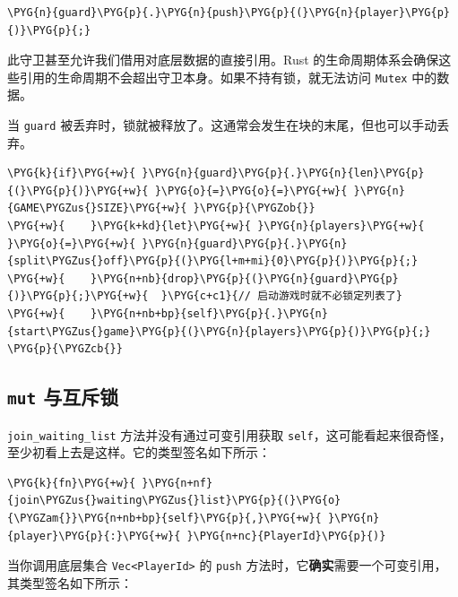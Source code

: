 \begin{Verbatim}[commandchars=\\\{\},breaklines=true,breakanywhere=true,fontsize=\codefont,xleftmargin=17bp]
\PYG{n}{guard}\PYG{p}{.}\PYG{n}{push}\PYG{p}{(}\PYG{n}{player}\PYG{p}{)}\PYG{p}{;}
\end{Verbatim}

此守卫甚至允许我们借用对底层数据的直接引用。Rust 的生命周期体系会确保这些引用的生命周期不会超出守卫本身。如果不持有锁，就无法访问 \texttt{Mutex} 中的数据。

当 \texttt{guard} 被丢弃时，锁就被释放了。这通常会发生在块的末尾，但也可以手动丢弃。

\begin{Verbatim}[commandchars=\\\{\},breaklines=true,breakanywhere=true,fontsize=\codefont,xleftmargin=17bp]
\PYG{k}{if}\PYG{+w}{ }\PYG{n}{guard}\PYG{p}{.}\PYG{n}{len}\PYG{p}{(}\PYG{p}{)}\PYG{+w}{ }\PYG{o}{=}\PYG{o}{=}\PYG{+w}{ }\PYG{n}{GAME\PYGZus{}SIZE}\PYG{+w}{ }\PYG{p}{\PYGZob{}}
\PYG{+w}{    }\PYG{k+kd}{let}\PYG{+w}{ }\PYG{n}{players}\PYG{+w}{ }\PYG{o}{=}\PYG{+w}{ }\PYG{n}{guard}\PYG{p}{.}\PYG{n}{split\PYGZus{}off}\PYG{p}{(}\PYG{l+m+mi}{0}\PYG{p}{)}\PYG{p}{;}
\PYG{+w}{    }\PYG{n+nb}{drop}\PYG{p}{(}\PYG{n}{guard}\PYG{p}{)}\PYG{p}{;}\PYG{+w}{  }\PYG{c+c1}{// 启动游戏时就不必锁定列表了}
\PYG{+w}{    }\PYG{n+nb+bp}{self}\PYG{p}{.}\PYG{n}{start\PYGZus{}game}\PYG{p}{(}\PYG{n}{players}\PYG{p}{)}\PYG{p}{;}
\PYG{p}{\PYGZcb{}}
\end{Verbatim}

\subsection{\texttt{mut} 与互斥锁}

\texttt{join\_waiting\_list} 方法并没有通过可变引用获取 \texttt{self}，这可能看起来很奇怪，至少初看上去是这样。它的类型签名如下所示：

\begin{Verbatim}[commandchars=\\\{\},breaklines=true,breakanywhere=true,fontsize=\codefont,xleftmargin=17bp]
\PYG{k}{fn}\PYG{+w}{ }\PYG{n+nf}{join\PYGZus{}waiting\PYGZus{}list}\PYG{p}{(}\PYG{o}{\PYGZam{}}\PYG{n+nb+bp}{self}\PYG{p}{,}\PYG{+w}{ }\PYG{n}{player}\PYG{p}{:}\PYG{+w}{ }\PYG{n+nc}{PlayerId}\PYG{p}{)}
\end{Verbatim}

当你调用底层集合 \texttt{Vec<PlayerId>} 的 \texttt{push} 方法时，它\textbf{确实}需要一个可变引用，其类型签名如下所示：

